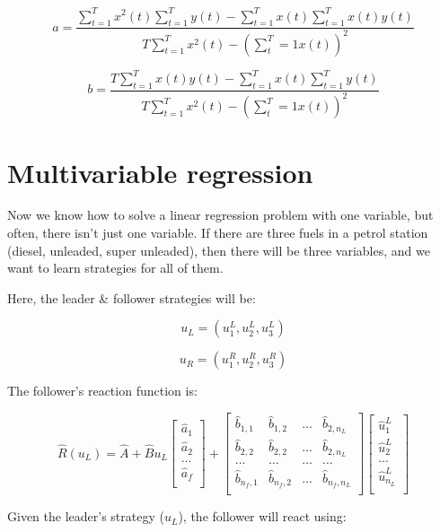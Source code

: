 \[
  a = \frac{ \sum^T_{t=1}x^2(t)\sum^T_{t=1}y(t)
    - \sum^T_{t=1}x(t)\sum^T_{t=1}x(t)y(t) }{ T\sum^T_{t=1}x^2(t) -
    (\sum^T_t{=1}x(t))^2 }
\]

\[
  b = \frac{
    T\sum^T_{t=1}x(t)y(t) - \sum^T_{t=1}x(t)\sum^T_{t=1}y(t)
  }{
    T\sum^T_{t=1}x^2(t) - (\sum^T_t{=1}x(t))^2
  }
\]


\section{Multivariable regression}

Now we know how to solve a linear regression problem with one variable, but
often, there isn't just one variable. If there are three fuels in a petrol
station (diesel, unleaded, super unleaded), then there will be three variables,
and we want to learn strategies for all of them.

Here, the leader \& follower strategies will be:

\[
  u_L = (u^L_1, u^L_2, u^L_3)
\]

\[
  u_R = (u^R_1, u^R_2, u^R_3)
\]

The follower's reaction function is:

\[
\hat{R}(u_L) = \hat{A} + \hat{B} u_L
  \begin{bmatrix}
    \hat{a}_1\\
    \hat{a}_2\\
    \dots\\
    \hat{a}_f\\
  \end{bmatrix}
  +
  \begin{bmatrix}
    \hat{b}_{1,1}& \hat{b}_{1,2} & \dots & \hat{b}_{2,n_L}\\
    \hat{b}_{2,2}& \hat{b}_{2,2} & \dots & \hat{b}_{2,n_L}\\
    \dots & \dots & \dots & \dots\\
    \hat{b}_{n_f,1} & \hat{b}_{n_f,2} & \dots & \hat{b}_{n_f,n_L}\\
  \end{bmatrix}
  \begin{bmatrix}
    \hat{u}_1^L\\
    \hat{u}_2^L\\
    \dots\\
    \hat{u}_{n_L}^L\\
  \end{bmatrix}
\]

Given the leader's strategy ($u_L$), the follower will react using:

